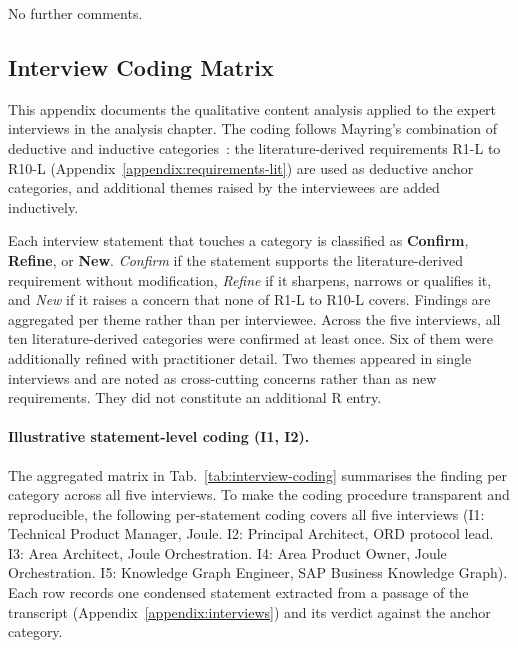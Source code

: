 \medskip{}

No further comments.

\subsection{Interview Coding Matrix}
\label{appendix:interview-coding}

This appendix documents the qualitative content analysis applied to the expert interviews in the analysis chapter. The coding follows Mayring's combination of deductive and inductive categories~\cite{mayring_qualitative_2014}: the literature-derived requirements R1-L to R10-L (Appendix~\ref{appendix:requirements-lit}) are used as deductive anchor categories, and additional themes raised by the interviewees are added inductively.

Each interview statement that touches a category is classified as \textbf{Confirm}, \textbf{Refine}, or \textbf{New}. \emph{Confirm} if the statement supports the literature-derived requirement without modification, \emph{Refine} if it sharpens, narrows or qualifies it, and \emph{New} if it raises a concern that none of R1-L to R10-L covers. Findings are aggregated per theme rather than per interviewee. Across the five interviews, all ten literature-derived categories were confirmed at least once. Six of them were additionally refined with practitioner detail. Two themes appeared in single interviews and are noted as cross-cutting concerns rather than as new requirements. They did not constitute an additional R entry.

\paragraph{Illustrative statement-level coding (I1, I2).}
The aggregated matrix in Tab.~\ref{tab:interview-coding} summarises the finding per category across all five interviews. To make the coding procedure transparent and reproducible, the following per-statement coding covers all five interviews (I1: Technical Product Manager, Joule. I2: Principal Architect, ORD protocol lead. I3: Area Architect, Joule Orchestration. I4: Area Product Owner, Joule Orchestration. I5: Knowledge Graph Engineer, SAP Business Knowledge Graph). Each row records one condensed statement extracted from a passage of the transcript (Appendix~\ref{appendix:interviews}) and its verdict against the anchor category.


